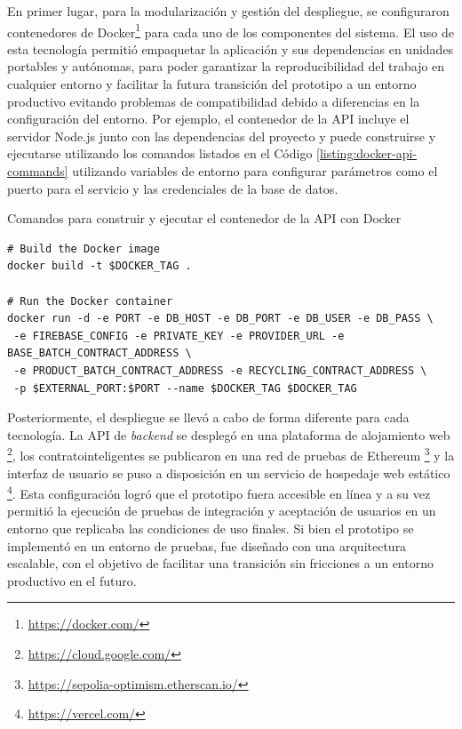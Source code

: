 En primer lugar, para la modularización y gestión del despliegue, se configuraron contenedores de Docker\footnote{\url{https://docker.com/}} para cada uno de los componentes del sistema. El uso de esta tecnología permitió empaquetar la aplicación y sus dependencias en unidades portables y autónomas, para poder garantizar la reproducibilidad del trabajo en cualquier entorno y facilitar la futura transición del prototipo a un entorno productivo evitando problemas de compatibilidad debido a diferencias en la configuración del entorno. Por ejemplo, el contenedor de la API incluye el servidor Node.js junto con las dependencias del proyecto y puede construirse y ejecutarse utilizando los comandos listados en el Código \ref{listing:docker-api-commands} utilizando variables de entorno para configurar parámetros como el puerto para el servicio y las credenciales de la base de datos.

\begin{listing}[!htb]
\caption{Comandos para construir y ejecutar el contenedor de la API con Docker}
\label{listing:docker-api-commands}
\begin{verbatim}
# Build the Docker image
docker build -t $DOCKER_TAG .

# Run the Docker container
docker run -d -e PORT -e DB_HOST -e DB_PORT -e DB_USER -e DB_PASS \
 -e FIREBASE_CONFIG -e PRIVATE_KEY -e PROVIDER_URL -e BASE_BATCH_CONTRACT_ADDRESS \
 -e PRODUCT_BATCH_CONTRACT_ADDRESS -e RECYCLING_CONTRACT_ADDRESS \
 -p $EXTERNAL_PORT:$PORT --name $DOCKER_TAG $DOCKER_TAG
\end{verbatim}
\end{listing}


Posteriormente, el despliegue se llevó a cabo de forma diferente para cada tecnología. La API de \textit{\gls{backend}} se desplegó en una plataforma de alojamiento web \footnote{\url{https://cloud.google.com/}}, los \glspl{contratointeligente} se publicaron en una red de pruebas de Ethereum \footnote{\url{https://sepolia-optimism.etherscan.io/}} y la interfaz de usuario se puso a disposición en un servicio de hospedaje web estático \footnote{\url{https://vercel.com/}}. Esta configuración logró que el prototipo fuera accesible en línea y a su vez permitió la ejecución de pruebas de integración y aceptación de usuarios en un entorno que replicaba las condiciones de uso finales. Si bien el prototipo se implementó en un entorno de pruebas, fue diseñado con una arquitectura escalable, con el objetivo de facilitar una transición sin fricciones a un entorno productivo en el futuro.

